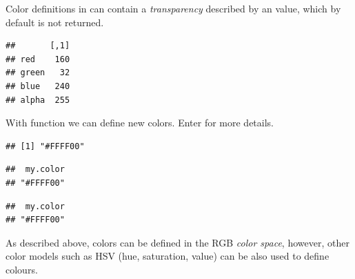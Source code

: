 \documentclass[krantz2]{krantz}\usepackage{knitr}
\begin{document}
Color definitions in \Rlang can contain a \emph{transparency} described by an  value, which by default is not returned.

\begin{knitrout}\footnotesize
{}\color{fgcolor}\begin{kframe}
\begin{alltt}
\hlstd{(}\hlstd{,}  \hlstd{=} \hlstd{)}
\end{alltt}
\begin{verbatim}
##       [,1]
## red    160
## green   32
## blue   240
## alpha  255
\end{verbatim}
\end{kframe}
\end{knitrout}

With function  we can define new colors. Enter  for more details.

\begin{knitrout}\footnotesize
{}\color{fgcolor}\begin{kframe}
\begin{alltt}
\hlstd{(}\hlstd{,} \hlstd{,} \hlstd{)}
\end{alltt}
\begin{verbatim}
## [1] "#FFFF00"
\end{verbatim}
\begin{alltt}
\hlstd{(}\hlstd{,} \hlstd{,} \hlstd{,}  \hlstd{=} \hlstd{)}
\end{alltt}
\begin{verbatim}
##  my.color 
## "#FFFF00"
\end{verbatim}
\begin{alltt}
\hlstd{(}\hlstd{,} \hlstd{,} \hlstd{,}  \hlstd{=} \hlstd{,}  \hlstd{=} \hlstd{)}
\end{alltt}
\begin{verbatim}
##  my.color 
## "#FFFF00"
\end{verbatim}
\end{kframe}
\end{knitrout}

As described above, colors can be defined in the RGB \emph{color space}, however, other color models such as HSV (hue, saturation, value) can be also used to define colours.
\end{document}
